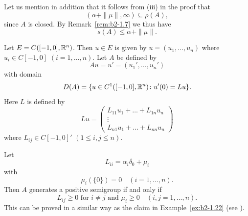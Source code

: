 Let us mention in addition that it follows from \upshape(iii) in the proof that 
%
\[
	(\alpha + \|\mu\|, \infty) \subseteq \rho(A) ,
\]
%
since $A$ is closed.
By Remark~\ref{rem:b2-1.7} we thus have
\begin{equation}\label{eq:b2-1.14}
s(A) \leq \alpha + \|\mu\|.
\end{equation}
\begin{example}\label{ex:b2-1.23}
Let $E = C([-1,0],\mathbb{R}^{n})$.
Then $u \in E$ is given by $u = (u_{1},\ldots,u_{n})$ where $u_{i} \in C[-1,0]$ $(i=1,\ldots,n)$.
Let $A$ be defined by 
%
\[
	Au = u' = (u_{1}',\ldots,u_{n}')
\]
% 
with domain 
%
\[
	D(A) = \{u \in C^{1}([-1,0],\mathbb{R}^{n}) \colon u'(0) = Lu\} .
\]
%
Here $L$ is defined by
\[
    Lu = \begin{pmatrix}
        L_{11}u_{1} + \ldots + L_{1n}u_{n} \\
        \vdots \\
        L_{n1}u_{1} + \ldots + L_{nn}u_{n}
    \end{pmatrix}
\]
where $L_{ij} \in C[-1,0]'$ $(1 \leq i,j \leq n)$.

Let 
%
\[
	 L_{ii} = \alpha_{i}\delta_{0} + \mu_{i}
\]
%
with
%
\[
	 \mu_{i}(\{0\}) = 0 \quad (i = 1, \ldots, n) .
\]
%
Then $A$ generates a positive semigroup if and only if 
\[
L_{ij} \geq 0 \text{ for } i \neq j \text{ and } \mu_{i} \geq 0 \quad (i,j = 1,\ldots,n) .
\]
This can be proved in a similar way as the claim in Example~\ref{ex:b2-1.22} 
(see \textcite{arendt:1984a}).
\end{example}


